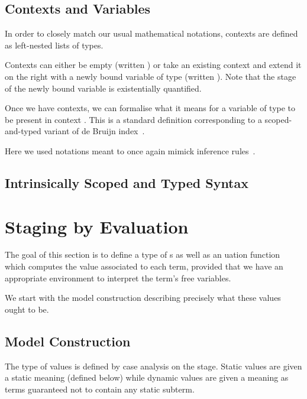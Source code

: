 \documentclass{article}
\begin{document}
\subsection{Contexts and Variables}

In order to closely match our usual mathematical notations,
contexts are defined as left-nested lists of types.


Contexts can either be empty (written )
or take an existing context  and extend it on the
right with a newly bound variable of type 
(written  \AIC{-,} ).
Note that the stage of the newly bound variable is
existentially quantified.

Once we have contexts, we can formalise what it means
for a variable of type  to be present in context .
This is a standard definition corresponding to a scoped-and-typed
variant of de Bruijn index~\cite{de1972lambda}.


Here we used notations meant to once again mimick inference
rules~\cite{DBLP:conf/cpp/Allais0MM17}.

\subsection{Intrinsically Scoped and Typed Syntax}


\section{Staging by Evaluation}

The goal of this section is to define a type of s
as well as an uation function which computes the
value associated to each term, provided that we have an
appropriate environment to interpret the term's free variables.


We start with the model construction describing precisely
what these values ought to be.

\subsection{Model Construction}

The type of values is defined by case analysis on the stage.
%
Static values are given a static meaning (defined below)
while dynamic values are given a meaning as terms
guaranteed not to contain any static subterm.
\end{document}
